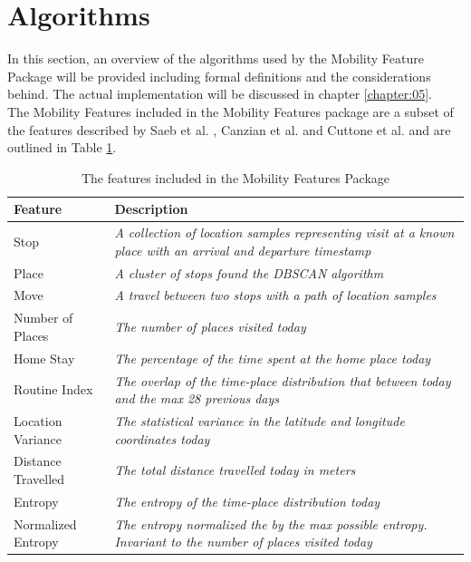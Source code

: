 \section{Algorithms}
\label{section:definitions}
In this section, an overview of the algorithms used by the Mobility Feature Package will be provided including formal definitions and the considerations behind. The actual implementation will be discussed in chapter \ref{chapter:05}.\\

The Mobility Features included in the Mobility Features package are a subset of the features described by Saeb et al. \cite{Saeb2015}, Canzian et al. \cite{Canzian2015} and Cuttone et al. \cite{sparse-location-2014} and are outlined in Table \ref{tab:features-nilsson}.

\begin{table}[h]
    \centering
    \begin{tabular}{|p{}|p{}|}
    \hline
    \textbf{Feature}   & \textbf{Description}                                                                                                  \\ \hline
    Stop               & \textit{A collection of location samples representing visit at a known place with an arrival and departure timestamp} \\ \hline
    Place              & \textit{A cluster of stops found the DBSCAN algorithm}                                                                \\ \hline
    Move               & \textit{A travel between two stops with a path of location samples}                                                   \\ \hline
    Number of Places   & \textit{The number of places visited today}                                                                           \\ \hline
    Home Stay          & \textit{The percentage of the time spent at the home place today}                                                     \\ \hline
    Routine Index      & \textit{The overlap of the time-place distribution that between today and the max 28 previous days}                   \\ \hline
    Location Variance  & \textit{The statistical variance in the latitude and longitude coordinates today}                                     \\ \hline
    Distance Travelled & \textit{The total distance travelled today in meters}                                                                 \\ \hline
    Entropy            & \textit{The entropy of the time-place distribution today}                                                             \\ \hline
    Normalized Entropy & \textit{The entropy normalized the by the max possible entropy. Invariant to the number of places visited today}      \\ \hline
    \end{tabular}
    \caption{The features included in the Mobility Features Package}
    \label{tab:features-nilsson}
\end{table}

